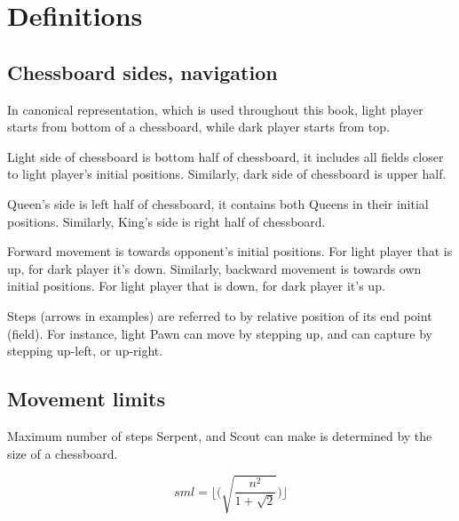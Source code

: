 

\chapter*{Definitions}
\label{ch:Definitions}

\section*{Chessboard sides, navigation}
\label{sec:Definitions/Chessboard sides, navigation}

In canonical representation, which is used throughout this book, light player
starts from bottom of a chessboard, while dark player starts from top.

Light side of chessboard is bottom half of chessboard, it includes all fields
closer to light player's initial positions. Similarly, dark side of chessboard
is upper half.

Queen's side is left half of chessboard, it contains both Queens in their
initial positions. Similarly, King's side is right half of chessboard.

Forward movement is towards opponent's initial positions. For light player
that is up, for dark player it's down. Similarly, backward movement is towards
own initial positions. For light player that is down, for dark player it's up.

Steps (arrows in examples) are referred to by relative position of its end point
(field). For instance, light Pawn can move by stepping up, and can capture by
stepping up-left, or up-right.

\clearpage %

\section*{Movement limits}
\label{sec:Definitions/Movement limits}

Maximum number of steps Serpent, and Scout can make is determined by the size
of a chessboard.

\begin{equation}
sml = \lfloor \bigg( \sqrt{ \frac{n^2}{1 + \sqrt{2}} } \bigg) \rfloor
\end{equation}

